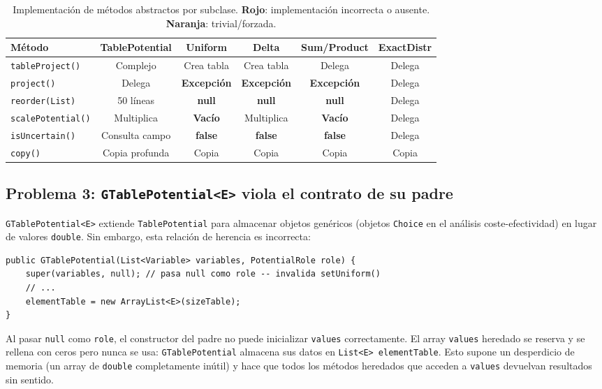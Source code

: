 \documentclass[11pt,a4paper]{article}
\newcommand{\code}[1]{\texttt{#1}}
\newcommand{\bad}[1]{\textcolor{codered}{\textbf{#1}}}
\newcommand{\warn}[1]{\textcolor{warnorange}{\textbf{#1}}}
\begin{document}
\begin{table}[H]
\centering
\small
\begin{tabular}{lccccc}
\toprule
\textbf{Método} & \textbf{TablePotential} & \textbf{Uniform} & \textbf{Delta} & \textbf{Sum/Product} & \textbf{ExactDistr} \\
\midrule
\code{tableProject()} & Complejo & Crea tabla & Crea tabla & Delega & Delega \\
\code{project()}      & Delega   & \bad{Excepción} & \bad{Excepción} & \bad{Excepción} & Delega \\
\code{reorder(List)}  & 50 líneas & \bad{null} & \bad{null} & \bad{null} & Delega \\
\code{scalePotential()} & Multiplica & \bad{Vacío} & Multiplica & \bad{Vacío} & Delega \\
\code{isUncertain()}  & Consulta campo & \warn{false} & \warn{false} & \warn{false} & Delega \\
\code{copy()}         & Copia profunda & Copia & Copia & Copia & Copia \\
\bottomrule
\end{tabular}
\caption{Implementación de métodos abstractos por subclase.  \bad{Rojo}: implementación
         incorrecta o ausente.  \warn{Naranja}: trivial/forzada.}
\label{tab:metodos-abstractos}
\end{table}

\subsection{Problema 3: \code{GTablePotential<E>} viola el contrato de su padre}
\label{sec:prob3}

\code{GTablePotential<E>} extiende \code{TablePotential} para almacenar objetos
genéricos (objetos \code{Choice} en el análisis coste-efectividad) en lugar de
valores \code{double}.  Sin embargo, esta relación de herencia es incorrecta:

\begin{lstlisting}[caption={Constructor de \code{GTablePotential} que viola el contrato del padre}]
public GTablePotential(List<Variable> variables, PotentialRole role) {
    super(variables, null); // pasa null como role -- invalida setUniform()
    // ...
    elementTable = new ArrayList<E>(sizeTable);
}
\end{lstlisting}

Al pasar \code{null} como \code{role}, el constructor del padre no puede inicializar
\code{values} correctamente.  El array \code{values} heredado se reserva y se
rellena con ceros pero nunca se usa: \code{GTablePotential} almacena sus datos en
\code{List<E> elementTable}.  Esto supone un desperdicio de memoria (un array de
\code{double} completamente inútil) y hace que todos los métodos heredados que
acceden a \code{values} devuelvan resultados sin sentido.
\end{document}
